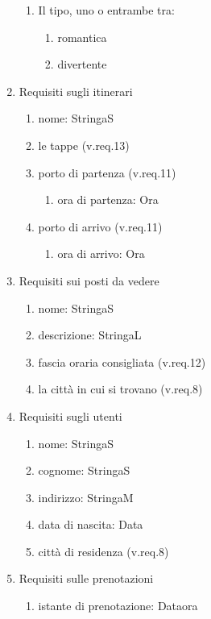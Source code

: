 \documentclass{article}
\begin{document}
\begin{enumerate}
\begin{enumerate}
        \item Il tipo, uno o entrambe tra:
        \begin{enumerate}
            \item romantica
            \item divertente
        \end{enumerate}
    \end{enumerate}
    \item Requisiti sugli itinerari
    \begin{enumerate}
        \item nome: StringaS
        \item le tappe (v.req.13)
        \item porto di partenza (v.req.11)
        \begin{enumerate}
            \item ora di partenza: Ora
        \end{enumerate}
        \item porto di arrivo (v.req.11)
        \begin{enumerate}
            \item ora di arrivo: Ora
        \end{enumerate}
    \end{enumerate}
    \item Requisiti sui posti da vedere
    \begin{enumerate}
        \item nome: StringaS
        \item descrizione: StringaL
        \item fascia oraria consigliata (v.req.12)
        \item la città in cui si trovano (v.req.8)
    \end{enumerate}
    \item Requisiti sugli utenti
    \begin{enumerate}
        \item nome: StringaS
        \item cognome: StringaS
        \item indirizzo: StringaM
        \item data di nascita: Data
        \item città di residenza (v.req.8)
    \end{enumerate}
    \item Requisiti sulle prenotazioni
    \begin{enumerate}
        \item istante di prenotazione: Dataora

\end{enumerate}
\end{enumerate}
\end{document}
